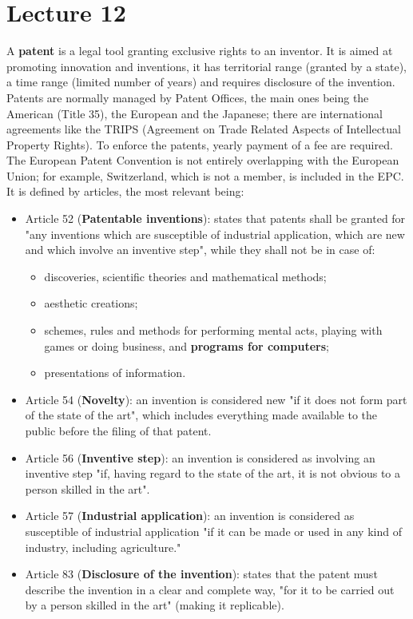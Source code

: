 \documentclass[a4paper, 10pt, titlepage]{article}
\begin{document}
\section{Lecture 12}
A \textbf{patent} is a legal tool granting exclusive rights to an inventor. It is aimed at promoting innovation and inventions, it has territorial range (granted by a state), a time range (limited number of years) and requires disclosure of the invention.
Patents are normally managed by Patent Offices, the main ones being the American (Title 35), the European and the Japanese; there are international agreements like the TRIPS (Agreement on Trade Related Aspects of Intellectual Property Rights). To enforce the patents, yearly payment of a fee are required. \medskip\\
The European Patent Convention is not entirely overlapping with the European Union; for example, Switzerland, which is not a member, is included in the EPC. It is defined by articles, the most relevant being:
\begin{itemize}
\item Article 52 (\textbf{Patentable inventions}): states that patents shall be granted for "any inventions which are susceptible of industrial application, which are new and which involve an inventive step", while they shall not be in case of:
	\begin{itemize}
	\item discoveries, scientific theories and mathematical methods;
	\item aesthetic creations;
	\item schemes, rules and methods for performing mental acts, playing with games or doing business, and \textbf{programs for computers};
	\item presentations of information.
	\end{itemize}
\item Article 54 (\textbf{Novelty}): an invention is considered new "if it does not form part of the state of the art", which includes everything made available to the public before the filing of that patent.
\item Article 56 (\textbf{Inventive step}): an invention is considered as involving an inventive step "if, having regard to the state of the art, it is not obvious to a person skilled in the art".
\item Article 57 (\textbf{Industrial application}): an invention is considered as susceptible of industrial application "if it can be made or used in any kind of industry, including agriculture."
\item Article 83 (\textbf{Disclosure of the invention}): states that the patent must describe the invention in a clear and complete way, "for it to be carried out by a person skilled in the art" (making it replicable).
\end{itemize}
\end{document}
